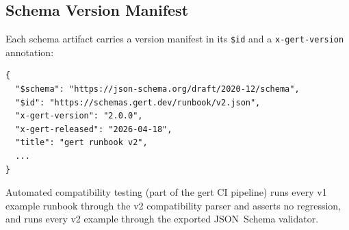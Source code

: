 \subsection{Schema Version Manifest}

Each schema artifact carries a version manifest in its \texttt{\$id} and a
\texttt{x-gert-version} annotation:

\begin{verbatim}
{
  "$schema": "https://json-schema.org/draft/2020-12/schema",
  "$id": "https://schemas.gert.dev/runbook/v2.json",
  "x-gert-version": "2.0.0",
  "x-gert-released": "2026-04-18",
  "title": "gert runbook v2",
  ...
}
\end{verbatim}

Automated compatibility testing (part of the gert CI pipeline) runs every
v1 example runbook through the v2 compatibility parser and asserts no regression,
and runs every v2 example through the exported JSON~Schema validator.
